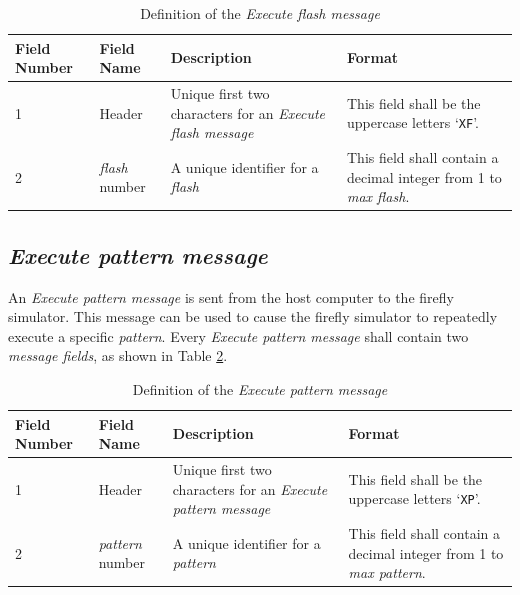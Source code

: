 \documentclass[letterpaper,11pt]{article}
\begin{document}
\begin{table}[H]
  \caption{Definition of the \textit{Execute flash message}}
  \centering
  \setlength\extrarowheight{2pt}
  \begin{tabular}[h]{|p{0.5in}|p{1.00in}|p{2.25in}|p{2.25in}|} \hline
    Field Number & Field Name & Description & Format \\ \hline
    1            & Header
                 & Unique first two characters for an \textit{Execute flash
                 message}
                 & This field shall be the uppercase letters `\texttt{XF}'.
                 \\ \hline
    2            & \textit{flash} number
                 & A unique identifier for a \textit{flash}
                 & This field shall contain a decimal integer from 1 to
                 \textit{max flash}.
                 \\ \hline
  \end{tabular}
  \label{tab:ExecuteFlash}
\end{table}

\subsection{\textit{Execute pattern message}}

An \textit{Execute pattern message} is sent from the host computer to the
firefly simulator. This message can be used to cause the firefly simulator to
repeatedly execute a specific \textit{pattern}. Every \textit{Execute pattern
message} shall contain two \textit{message fields}, as shown in Table
\ref{tab:ExecutePattern}.

\begin{table}[H]
  \caption{Definition of the \textit{Execute pattern message}}
  \centering
  \setlength\extrarowheight{2pt}
  \begin{tabular}[h]{|p{0.5in}|p{1.00in}|p{2.25in}|p{2.25in}|} \hline
    Field Number & Field Name & Description & Format \\ \hline
    1            & Header
                 & Unique first two characters for an \textit{Execute pattern
                 message}
                 & This field shall be the uppercase letters `\texttt{XP}'.
                 \\ \hline
    2            & \textit{pattern} number
                 & A unique identifier for a \textit{pattern}
                 & This field shall contain a decimal integer from 1 to
                 \textit{max pattern}.
                 \\ \hline
  \end{tabular}
  \label{tab:ExecutePattern}
\end{table}
\end{document}
